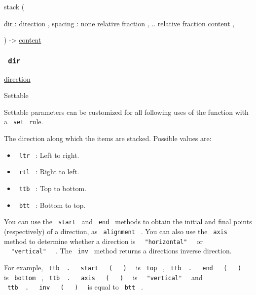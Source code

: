{ stack } (

{ \hyperref[parameters-dir]{dir :}
\href{/docs/reference/layout/direction/}{direction} , } {
\hyperref[parameters-spacing]{spacing :}
\href{/docs/reference/foundations/none/}{none}
\href{/docs/reference/layout/relative/}{relative}
\href{/docs/reference/layout/fraction/}{fraction} , } {
\hyperref[parameters-children]{..}
\href{/docs/reference/layout/relative/}{relative}
\href{/docs/reference/layout/fraction/}{fraction}
\href{/docs/reference/foundations/content/}{content} , }

) -\textgreater{} \href{/docs/reference/foundations/content/}{content}

\subsubsection{\texorpdfstring{\texttt{\ dir\ }}{ dir }}\label{parameters-dir}

\href{/docs/reference/layout/direction/}{direction}

{{ Settable }}

\label{parameters-dir-settable-tooltip}
Settable parameters can be customized for all following uses of the
function with a \texttt{\ set\ } rule.

The direction along which the items are stacked. Possible values are:

\begin{itemize}
\tightlist
\item
  \texttt{\ ltr\ } : Left to right.
\item
  \texttt{\ rtl\ } : Right to left.
\item
  \texttt{\ ttb\ } : Top to bottom.
\item
  \texttt{\ btt\ } : Bottom to top.
\end{itemize}

You can use the \texttt{\ start\ } and \texttt{\ end\ } methods to
obtain the initial and final points (respectively) of a direction, as
\texttt{\ alignment\ } . You can also use the \texttt{\ axis\ } method
to determine whether a direction is
\texttt{\ }{\texttt{\ "horizontal"\ }}\texttt{\ } or
\texttt{\ }{\texttt{\ "vertical"\ }}\texttt{\ } . The \texttt{\ inv\ }
method returns a direction\textquotesingle s inverse direction.

For example,
\texttt{\ ttb\ }{\texttt{\ .\ }}\texttt{\ }{\texttt{\ start\ }}\texttt{\ }{\texttt{\ (\ }}\texttt{\ }{\texttt{\ )\ }}\texttt{\ }
is \texttt{\ top\ } ,
\texttt{\ ttb\ }{\texttt{\ .\ }}\texttt{\ }{\texttt{\ end\ }}\texttt{\ }{\texttt{\ (\ }}\texttt{\ }{\texttt{\ )\ }}\texttt{\ }
is \texttt{\ bottom\ } ,
\texttt{\ ttb\ }{\texttt{\ .\ }}\texttt{\ }{\texttt{\ axis\ }}\texttt{\ }{\texttt{\ (\ }}\texttt{\ }{\texttt{\ )\ }}\texttt{\ }
is \texttt{\ }{\texttt{\ "vertical"\ }}\texttt{\ } and
\texttt{\ ttb\ }{\texttt{\ .\ }}\texttt{\ }{\texttt{\ inv\ }}\texttt{\ }{\texttt{\ (\ }}\texttt{\ }{\texttt{\ )\ }}\texttt{\ }
is equal to \texttt{\ btt\ } .

